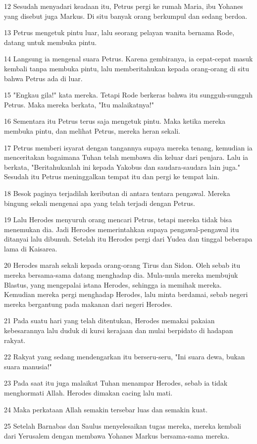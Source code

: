 \par 12 Sesudah menyadari keadaan itu, Petrus pergi ke rumah Maria, ibu Yohanes yang disebut juga Markus. Di situ banyak orang berkumpul dan sedang berdoa.
\par 13 Petrus mengetuk pintu luar, lalu seorang pelayan wanita bernama Rode, datang untuk membuka pintu.
\par 14 Langsung ia mengenal suara Petrus. Karena gembiranya, ia cepat-cepat masuk kembali tanpa membuka pintu, lalu memberitahukan kepada orang-orang di situ bahwa Petrus ada di luar.
\par 15 "Engkau gila!" kata mereka. Tetapi Rode berkeras bahwa itu sungguh-sungguh Petrus. Maka mereka berkata, "Itu malaikatnya!"
\par 16 Sementara itu Petrus terus saja mengetuk pintu. Maka ketika mereka membuka pintu, dan melihat Petrus, mereka heran sekali.
\par 17 Petrus memberi isyarat dengan tangannya supaya mereka tenang, kemudian ia menceritakan bagaimana Tuhan telah membawa dia keluar dari penjara. Lalu ia berkata, "Beritahukanlah ini kepada Yakobus dan saudara-saudara lain juga." Sesudah itu Petrus meninggalkan tempat itu dan pergi ke tempat lain.
\par 18 Besok paginya terjadilah keributan di antara tentara pengawal. Mereka bingung sekali mengenai apa yang telah terjadi dengan Petrus.
\par 19 Lalu Herodes menyuruh orang mencari Petrus, tetapi mereka tidak bisa menemukan dia. Jadi Herodes memerintahkan supaya pengawal-pengawal itu ditanyai lalu dibunuh. Setelah itu Herodes pergi dari Yudea dan tinggal beberapa lama di Kaisarea.
\par 20 Herodes marah sekali kepada orang-orang Tirus dan Sidon. Oleh sebab itu mereka bersama-sama datang menghadap dia. Mula-mula mereka membujuk Blastus, yang mengepalai istana Herodes, sehingga ia memihak mereka. Kemudian mereka pergi menghadap Herodes, lalu minta berdamai, sebab negeri mereka bergantung pada makanan dari negeri Herodes.
\par 21 Pada suatu hari yang telah ditentukan, Herodes memakai pakaian kebesarannya lalu duduk di kursi kerajaan dan mulai berpidato di hadapan rakyat.
\par 22 Rakyat yang sedang mendengarkan itu berseru-seru, "Ini suara dewa, bukan suara manusia!"
\par 23 Pada saat itu juga malaikat Tuhan menampar Herodes, sebab ia tidak menghormati Allah. Herodes dimakan cacing lalu mati.
\par 24 Maka perkataan Allah semakin tersebar luas dan semakin kuat.
\par 25 Setelah Barnabas dan Saulus menyelesaikan tugas mereka, mereka kembali dari Yerusalem dengan membawa Yohanes Markus bersama-sama mereka.

